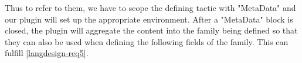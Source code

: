 Thus to refer to them, we have to scope the defining tactic with
"MetaData" and our plugin will set up the appropriate environment. After
a "MetaData" block is closed, the plugin will aggregate the content into
the family being defined so that they can also be used when defining
the following fields of the family.
This can fulfill \ref{langdesign-req5}.





